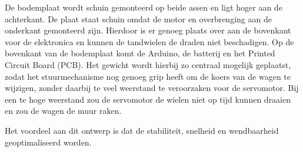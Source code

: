 De bodemplaat wordt schuin gemonteerd op beide assen en ligt hoger aan de 
achterkant. De plaat staat schuin omdat de motor en overbrenging aan de 
onderkant gemonteerd zijn. Hierdoor is er genoeg plaats over aan de bovenkant 
voor de elektronica en kunnen de tandwielen de draden niet beschadigen. 
Op de bovenkant van de bodemplaat komt de Arduino, de batterij en het Printed 
Circuit Board (PCB). Het gewicht wordt hierbij zo centraal mogelijk geplaatst, 
zodat het stuurmechanisme nog genoeg grip heeft om de koers van de wagen te 
wijzigen, zonder daarbij te veel weerstand te veroorzaken voor de servomotor. 
Bij een te hoge weerstand zou de servomotor de wielen niet op tijd kunnen 
draaien en zou de wagen de muur raken.

Het voordeel aan dit ontwerp is dat de stabiliteit, snelheid en wendbaarheid 
geoptimaliseerd worden. 
